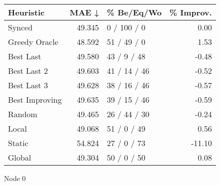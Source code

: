 \begin{tabular}{lrlr}
\toprule
\textbf{Heuristic} & \textbf{MAE ↓} & \textbf{\% Be/Eq/Wo} & \textbf{\% Improv.} \\
\midrule
            Synced &         49.345 &          0 / 100 / 0 &                0.00 \\
     Greedy Oracle &         48.592 &          51 / 49 / 0 &                1.53 \\
         Best Last &         49.580 &          43 / 9 / 48 &               -0.48 \\
       Best Last 2 &         49.603 &         41 / 14 / 46 &               -0.52 \\
       Best Last 3 &         49.628 &         38 / 16 / 46 &               -0.57 \\
    Best Improving &         49.635 &         39 / 15 / 46 &               -0.59 \\
            Random &         49.465 &         26 / 44 / 30 &               -0.24 \\
             Local &         49.068 &          51 / 0 / 49 &                0.56 \\
            Static &         54.824 &          27 / 0 / 73 &              -11.10 \\
            Global &         49.304 &          50 / 0 / 50 &                0.08 \\
\bottomrule
\end{tabular}
\caption{Node 0}
\label{tab:iid_lr05_le1_bs2_0}
